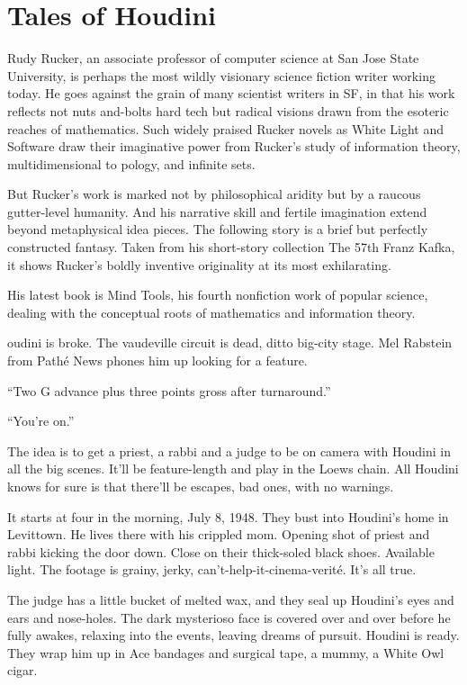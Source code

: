 \chapter{Tales of Houdini}

Rudy Rucker, an associate professor of computer science at San Jose State University, is perhaps the most wildly visionary science fiction writer working today. He goes against the grain of many scientist writers in SF, in that his work reflects not nuts and-bolts hard tech but radical visions drawn from the esoteric reaches of mathematics. Such widely praised Rucker novels as White Light and Software draw their imaginative power from Rucker's study of information theory, multidimensional to pology, and infinite sets.

But Rucker's work is marked not by philosophical aridity but by a raucous gutter-level humanity. And his narrative skill and fertile imagination extend beyond metaphysical idea pieces. The following story is a brief but perfectly constructed fantasy. Taken from his short-story collection The 57th Franz Kafka, it shows Rucker's boldly inventive originality at its most exhilarating.

His latest book is Mind Tools, his fourth nonfiction work of popular science, dealing with the conceptual roots of mathematics and information theory.

\hrulefill

oudini is broke. The vaudeville circuit is dead, ditto big-city stage. Mel Rabstein from Pathé News phones him up looking for a feature.

``Two G advance plus three points gross after turnaround.''

``You're on.''

The idea is to get a priest, a rabbi and a judge to be on camera with Houdini in all the big scenes. It'll be feature-length and play in the Loews chain. All Houdini knows for sure is that there'll be escapes, bad ones, with no warnings.

It starts at four in the morning, July 8, 1948. They bust into Houdini's home in Levittown. He lives there with his crippled mom. Opening shot of priest and rabbi kicking the door down. Close on their thick-soled black shoes. Available light. The footage is grainy, jerky, can't-help-it-cinema-verité. It's all true.

The judge has a little bucket of melted wax, and they seal up Houdini's eyes and ears and nose-holes. The dark mysterioso face is covered over and over before he fully awakes, relaxing into the events, leaving dreams of pursuit. Houdini is ready. They wrap him up in Ace bandages and surgical tape, a mummy, a White Owl cigar.

